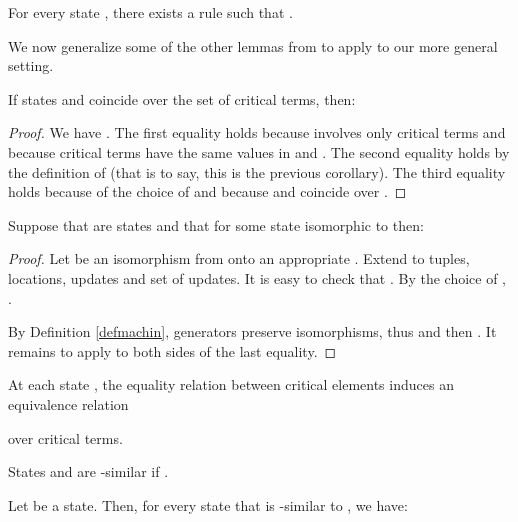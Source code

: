\documentclass[envcountsame]{llncs}
\begin{document}
\begin{corollary}
For every state , there exists a
rule  such that .



\end{corollary}

We now generalize some of the other lemmas from \cite{Gur00} to apply to our
more general setting.

\begin{lemma}
\label{sixsept}
If states  and  coincide over the set  of critical terms,
then:

\end{lemma}

\begin{proof}
We have .
The first equality holds because  involves only critical terms
and because critical terms have the same values in  and . The
second equality holds by the definition of  (that is to say, this
is the previous corollary). The third equality
holds because of the choice of  and because  and  coincide
over .
\end{proof}


\begin{lemma} \label{prevle}
Suppose that  are states and that  for some
state  isomorphic to  then:

\end{lemma}

\begin{proof}
Let  be an isomorphism from  onto an appropriate . Extend  to tuples,
locations, updates and set of updates. It is easy to check that .
By the choice of , .

By Definition \ref{defmachin}, generators preserve isomorphisms,
thus  and then .
It remains to apply  to both sides of the last equality.
\end{proof}

At each state , the equality relation between critical elements
induces an equivalence relation

over critical terms.

States  and  are -similar if .

\begin{lemma}\label{lemma:lem62gur}
Let  be a state. Then,  for every
state  that is  -similar to , we have:

\end{lemma}
\end{document}
